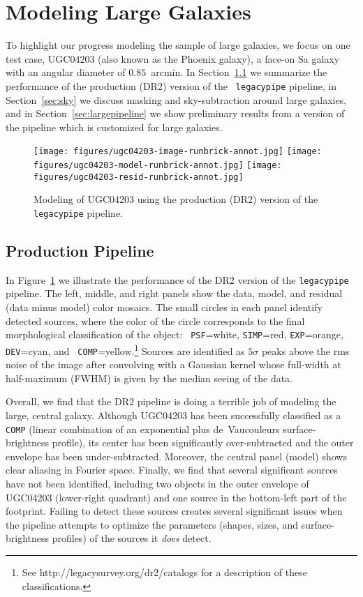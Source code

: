 \section{Modeling Large Galaxies}\label{sec:modeling}

To highlight our progress modeling the sample of large galaxies, we focus on one
test case, UGC04203 (also known as the Phoenix galaxy), a face-on Sa galaxy with
an angular diameter of $0.85$~arcmin.  In Section~\ref{sec:production} we
summarize the performance of the production (DR2) version of the {\tt
  legacypipe} pipeline, in Section~\ref{sec:sky} we discuss masking and
sky-subtraction around large galaxies, and in Section~\ref{sec:largepipeline} we
show preliminary results from a version of the pipeline which is customized for
large galaxies.

\begin{figure}%
\centering
\texttt{[image: figures/ugc04203-image-runbrick-annot.jpg]}
\texttt{[image: figures/ugc04203-model-runbrick-annot.jpg]}
\texttt{[image: figures/ugc04203-resid-runbrick-annot.jpg]}
\caption{Modeling of UGC04203 using the production (DR2) version of the
  {\tt legacypipe} pipeline. 
  \label{fig:runbrick}} 
\end{figure}

\subsection{Production Pipeline}\label{sec:production}

In Figure~\ref{fig:runbrick} we illustrate the performance of the DR2 version of
the {\tt legacypipe} pipeline.  The left, middle, and right panels show the
data, model, and residual (data minus model) color mosaics.  The small circles
in each panel identify detected sources, where the color of the circle
corresponds to the final morphological classification of the object: {\tt
  PSF}=white, {\tt SIMP}=red, {\tt EXP}=orange, {\tt DEV}=cyan, and {\tt
  COMP}=yellow.\footnote{See http://legacysurvey.org/dr2/catalogs for a
  description of these classifications.}  Sources are identified as $5 \sigma$
peaks above the rms noise of the image after convolving with a Gaussian kernel
whose full-width at half-maximum (FWHM) is given by the median seeing of the
data. 

Overall, we find that the DR2 pipeline is doing a terrible job of modeling the
large, central galaxy.  Although UGC04203 has been successfully classified as a
{\tt COMP} (linear combination of an exponential plus de~Vaucouleurs
surface-brightness profile), its center has been significantly over-subtracted
and the outer envelope has been under-subtracted.  Moreover, the central panel
(model) shows clear aliasing in Fourier space.  Finally, we find that several
significant sources have not been identified, including two objects in the outer
envelope of UGC04203 (lower-right quadrant) and one source in the bottom-left
part of the footprint.  Failing to detect these sources creates several
significant issues when the pipeline attempts to optimize the parameters
(shapes, sizes, and surface-brightness profiles) of the sources it \emph{does}
detect.

